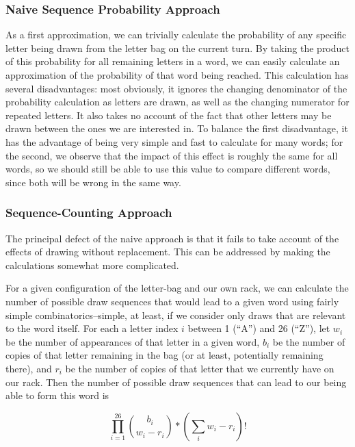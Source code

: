 \documentclass[11pt]{article}
\begin{document}
\subsubsection{Naive Sequence Probability Approach}

As a first approximation, we can trivially calculate the probability of any specific letter being drawn from the letter bag on the current turn.  By taking the product of this probability for all remaining letters in a word, we can easily calculate an approximation of the probability of that word being reached.  This calculation has several disadvantages: most obviously, it ignores the changing denominator of the probability calculation as letters are drawn, as well as the changing numerator for repeated letters.  It also takes no account of the fact that other letters may be drawn between the ones we are interested in.  To balance the first disadvantage, it has the advantage of being very simple and fast to calculate for many words; for the second, we observe that the impact of this effect is roughly the same for all words, so we should still be able to use this value to compare different words, since both will be wrong in the same way.

\subsubsection{Sequence-Counting Approach}
\label{sec:sequenceCounting}

The principal defect of the naive approach is that it fails to take account of the effects of drawing without replacement.  This can be addressed by making the calculations somewhat more complicated.

For a given configuration of the letter-bag and our own rack, we can calculate the number of possible draw sequences that would lead to a given word using fairly simple combinatorics--simple, at least, if we consider only draws that are relevant to the word itself.  For each a letter index $i$ between 1 (``A'') and 26 (``Z''), let $w_{i}$ be the number of appearances of that letter in a given word, $b_{i}$ be the number of copies of that letter remaining in the bag (or at least, potentially remaining there), and $r_{i}$ be the number of copies of that letter that we currently have on our rack.  Then the number of possible draw sequences that can lead to our being able to form this word is

$$\prod_{i=1}^{26}{b_{i}\choose w_{i} - r_{i}}*\left( \sum_{i}w_{i} - r_{i}\right)!$$
\end{document}
